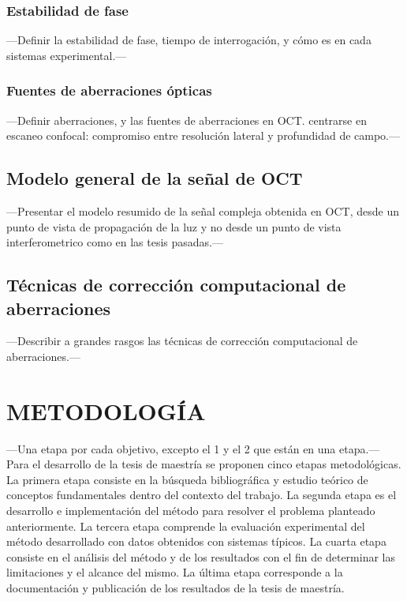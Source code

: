 \documentclass[letter, 12 pt]{article}
\begin{document}
		\subsubsection{Estabilidad de fase}
---Definir la estabilidad de fase, tiempo de interrogación, y cómo es en cada sistemas experimental.---

		\subsubsection{Fuentes de aberraciones ópticas}
---Definir aberraciones, y las fuentes de aberraciones en OCT. centrarse en escaneo confocal: compromiso entre resolución lateral y profundidad de campo.---

	\subsection{Modelo general de la señal de OCT}
---Presentar el modelo resumido de la señal compleja obtenida en OCT, desde un punto de vista de propagación de la luz y no desde un punto de vista interferometrico como en las tesis pasadas.---

	\subsection{Técnicas de corrección computacional de aberraciones}
---Describir a grandes rasgos las técnicas de corrección computacional de aberraciones.---


\section{METODOLOGÍA}
---Una etapa por cada objetivo, excepto el 1 y el 2 que están en una etapa.---\\

Para el desarrollo de la tesis de maestría se proponen cinco etapas metodológicas. La primera etapa consiste en la búsqueda bibliográfica y estudio teórico de conceptos fundamentales dentro del contexto del trabajo. La segunda etapa es el desarrollo e implementación del método para resolver el problema planteado anteriormente. La tercera etapa comprende la evaluación experimental del método desarrollado con datos obtenidos con sistemas típicos. La cuarta etapa consiste en el análisis del método y de los resultados con el fin de determinar las limitaciones y el alcance del mismo. La última etapa corresponde a la documentación y publicación de los resultados de la tesis de maestría. \\
\end{document}
